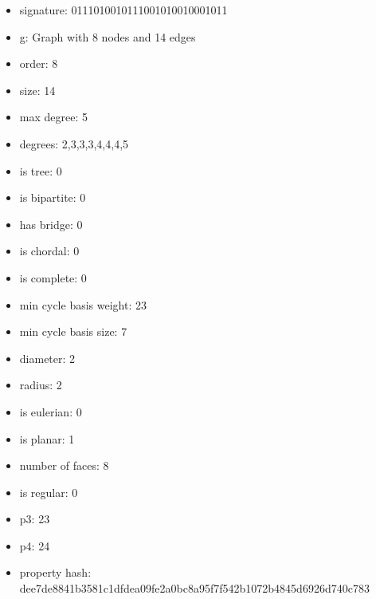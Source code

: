 \begin{itemize}
\item signature: 0111010010111001010010001011
\item g: Graph with 8 nodes and 14 edges
\item order: 8
\item size: 14
\item max degree: 5
\item degrees: 2,3,3,3,4,4,4,5
\item is tree: 0
\item is bipartite: 0
\item has bridge: 0
\item is chordal: 0
\item is complete: 0
\item min cycle basis weight: 23
\item min cycle basis size: 7
\item diameter: 2
\item radius: 2
\item is eulerian: 0
\item is planar: 1
\item number of faces: 8
\item is regular: 0
\item p3: 23
\item p4: 24
\item property hash: dee7de8841b3581c1dfdea09fe2a0bc8a95f7f542b1072b4845d6926d740c783
\end{itemize}
\newpage
\begin{figure}
\end{figure}
